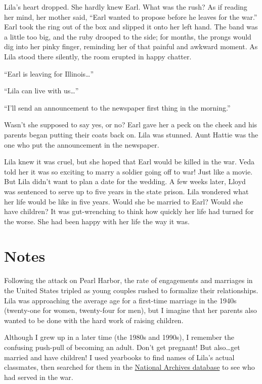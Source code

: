 \documentclass[
  letterpaper,
]{book}
\begin{document}
Lila's heart dropped. She hardly knew Earl. What was the rush? As if
reading her mind, her mother said, ``Earl wanted to propose before he
leaves for the war.'' Earl took the ring out of the box and slipped it
onto her left hand. The band was a little too big, and the ruby drooped
to the side; for months, the prongs would dig into her pinky finger,
reminding her of that painful and awkward moment. As Lila stood there
silently, the room erupted in happy chatter.

``Earl is leaving for Illinois\ldots{}''

``Lila can live with us\ldots{}''

``I'll send an announcement to the newspaper first thing in the
morning.''

Wasn't she supposed to say yes, or no? Earl gave her a peck on the cheek
and his parents began putting their coats back on. Lila was stunned.
Aunt Hattie was the one who put the announcement in the newspaper.

Lila knew it was cruel, but she hoped that Earl would be killed in the
war. Veda told her it was so exciting to marry a soldier going off to
war! Just like a movie. But Lila didn't want to plan a date for the
wedding. A few weeks later, Lloyd was sentenced to serve up to five
years in the state prison. Lila wondered what her life would be like in
five years. Would she be married to Earl? Would she have children? It
was gut-wrenching to think how quickly her life had turned for the
worse. She had been happy with her life the way it was.

\section{Notes}\label{notes-25}

Following the attack on Pearl Harbor, the rate of engagements and
marriages in the United States tripled as young couples rushed to
formalize their relationships. Lila was approaching the average age for
a first-time marriage in the 1940s (twenty-one for women, twenty-four
for men), but I imagine that her parents also wanted to be done with the
hard work of raising children.

Although I grew up in a later time (the 1980s and 1990s), I remember the
confusing push-pull of becoming an adult. Don't get pregnant! But
also\ldots get married and have children! I used yearbooks to find names
of Lila's actual classmates, then searched for them in the
\href{https://aad.archives.gov/aad/index.jsp}{National Archives
database} to see who had served in the war.
\end{document}
